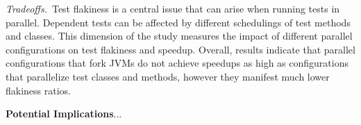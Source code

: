 
\vspace{1ex}\noindent\emph{Tradeoffs.}~Test flakiness is a central
issue that can arise when running tests in parallel.  Dependent tests
can be affected by different schedulings of test methods and classes.
This dimension of the study measures the impact of different parallel
configurations on test flakiness and speedup.  Overall, results
indicate that parallel configurations that fork JVMs do not achieve
speedups as high as configurations that parallelize test classes and
methods, however they manifest much lower flakiness ratios.

\vspace{1ex}\noindent\textbf{Potential Implications}...





